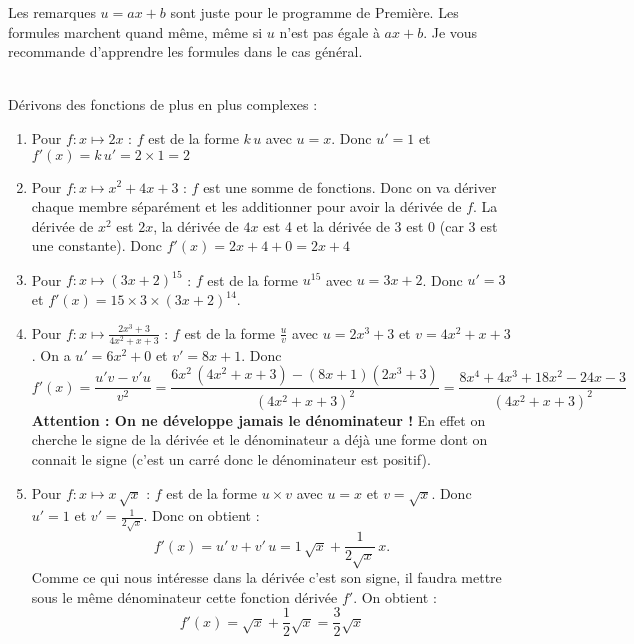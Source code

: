 \documentclass[12pt,fleqn]{report} %
\begin{document}
\begin{itemize}
	\begin{remark}
		
		Les remarques $u = ax +b$ sont juste pour le programme de Première. Les formules marchent quand même, même si $u$ n'est pas égale à $ax +b$. Je vous recommande d'apprendre les formules dans le cas général. 
		
	\end{remark}
\end{itemize}
\begin{example}\text{ }\\
	Dérivons des fonctions de plus en plus complexes  : 
	\begin{enumerate}
		\item Pour $f: x\mapsto 2x$ :  $f$ est de la forme $k\, u $ avec $u  = x$. Donc $u' = 1$ et $f'(x) = k\, u'= 2\times 1 = 2$
		\item Pour $f:x \mapsto x^2 + 4x + 3$ : $f$ est une somme de fonctions. Donc on va dériver chaque membre séparément et les additionner pour avoir la dérivée de $f$. La dérivée de $x^2$ est $2x$, la dérivée de $4x$ est 4 et la dérivée de 3 est 0 (car 3 est une constante). Donc $f'(x) = 2x + 4 + 0 = 2x + 4$
		
		\item Pour $f : x \mapsto (3x + 2)^{15}$ : $f$ est de la forme $u^{15}$ avec $u = 3x + 2$. Donc $u' = 3$ et $f'(x) = 15 \times 3 \times (3x+2)^{14}$.
		
		\item Pour $f : x \mapsto \frac{2x^3 + 3}{4x^2 + x + 3}$ : $f$ est de la forme $\frac{u}{v}$ avec $u = 2 x^3 + 3$ et $v = 4 x^2 + x + 3$. On a $u' = 6 x^2 + 0$ et $v' = 8x + 1$. Donc \[
		f'(x) = \frac{u' v - v'u}{v^2} = \frac{6x^2\,(4x^2 + x +3) - (8x + 1)(2x^3 + 3)}{(4x^2 + x + 3)^2} = \frac{8x^4 + 4x^3 + 18x^2 - 24x - 3}{(4x^2 + x + 3)^2}
		\]
		\textbf{Attention : On ne développe jamais le dénominateur !} En effet on cherche le signe de la dérivée et le dénominateur a déjà une forme dont on connait le signe (c'est un carré donc le dénominateur est positif).
		\item Pour $f : x \mapsto x\, \sqrt{x}$ : $f$ est de la forme $u\times v$ avec $u = x$ et $v = \sqrt{x}$. Donc $u' = 1$ et $v' = \frac{1}{2\sqrt{x}}$. Donc on obtient : \[
		f'(x) = u'\,v + v'\,u = 1\,\sqrt{x} + \frac{1}{2\sqrt{x}}\,x.
		\] Comme ce qui nous intéresse dans la dérivée c'est son signe, il faudra mettre sous le même dénominateur cette fonction dérivée $f'$. On obtient : 
		\[
		f'(x) = \sqrt{x} + \frac{1}{2}\sqrt{x} = \frac{3}{2}\sqrt{x}
		\]
		

\end{enumerate}
\end{example}
\end{document}
